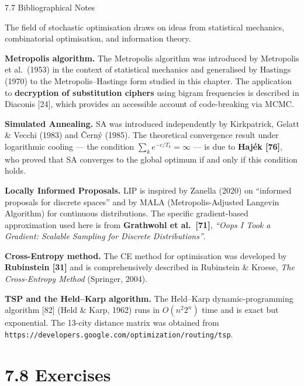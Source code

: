 \documentclass[aspectratio=169,10pt]{beamer}
\begin{document}
\begin{frame}[allowframebreaks]{7.7 Bibliographical Notes}

The field of stochastic optimisation draws on ideas from statistical
mechanics, combinatorial optimisation, and information theory.

\medskip
\textbf{Metropolis algorithm.}
The Metropolis algorithm was introduced by Metropolis et al.\ (1953) in the
context of statistical mechanics and generalised by Hastings (1970) to the
Metropolis--Hastings form studied in this chapter.  The application to
\textbf{decryption of substitution ciphers} using bigram frequencies is
described in Diaconis [24], which provides an accessible account of
code-breaking via MCMC.

\medskip
\textbf{Simulated Annealing.}
SA was introduced independently by Kirkpatrick, Gelatt \& Vecchi (1983) and
\v{C}ern\'{y} (1985).  The theoretical convergence result under logarithmic
cooling --- the condition $\sum_k e^{-c/T_k} = \infty$ --- is due to
\textbf{Haj\'{e}k [76]}, who proved that SA converges to the global optimum
if and only if this condition holds.

\medskip
\textbf{Locally Informed Proposals.}
LIP is inspired by Zanella (2020) on ``informed proposals for discrete
spaces'' and by MALA (Metropolis-Adjusted Langevin Algorithm) for continuous
distributions.  The specific gradient-based approximation used here is from
\textbf{Grathwohl et al.\ [71]}, \emph{``Oops I Took a Gradient: Scalable
Sampling for Discrete Distributions''}.

\medskip
\textbf{Cross-Entropy method.}
The CE method for optimisation was developed by \textbf{Rubinstein [31]} and
is comprehensively described in Rubinstein \& Kroese, \emph{The
Cross-Entropy Method} (Springer, 2004).

\medskip
\textbf{TSP and the Held--Karp algorithm.}
The Held--Karp dynamic-programming algorithm [82] (Held \& Karp, 1962) runs
in $O(n^2 2^n)$ time and is exact but exponential.  The 13-city distance
matrix was obtained from
\texttt{https://developers.google.com/optimization/routing/tsp}.

\end{frame}

\section{7.8 Exercises}
\end{document}

